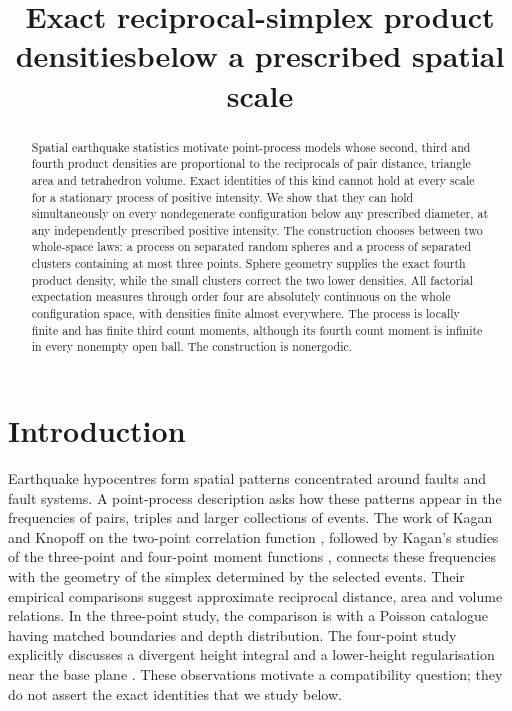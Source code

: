 \documentclass[11pt,a4paper]{article}
\title{Exact reciprocal-simplex product densities\newline below a prescribed spatial scale}
\author{}
\date{}
\numberwithin{equation}{section}
\theoremstyle{definition}
\theoremstyle{remark}
\begin{document}
\maketitle

\begin{abstract}
Spatial earthquake statistics motivate point-process models whose second,
third and fourth product densities are proportional to the reciprocals of
pair distance, triangle area and tetrahedron volume. Exact identities of this
kind cannot hold at every scale for a stationary process of positive
intensity. We show that they can hold simultaneously on every nondegenerate
configuration below any prescribed diameter, at any independently prescribed
positive intensity. The construction chooses between two whole-space laws:
a process on separated random spheres and a process of separated clusters
containing at most three points. Sphere geometry supplies the exact fourth
product density, while the small clusters correct the two lower densities.
All factorial expectation measures through order four are absolutely
continuous on the whole configuration space, with densities finite almost
everywhere. The process is locally finite and has finite third count moments,
although its fourth count moment is infinite in every nonempty open ball.
The construction is nonergodic.
\end{abstract}

\section{Introduction}

Earthquake hypocentres form spatial patterns concentrated around faults and
fault systems. A point-process description asks how these patterns appear in
the frequencies of pairs, triples and larger collections of events. The
work of Kagan and Knopoff on the two-point correlation function
\cite{KaganKnopoff1980}, followed by Kagan's studies of the three-point and
four-point moment functions \cite{Kagan1981Three,Kagan1981Four}, connects
these frequencies with the geometry of the simplex determined by the
selected events. Their empirical comparisons suggest approximate reciprocal
distance, area and volume relations. In the three-point study, the
comparison is with a Poisson catalogue having matched boundaries and depth
distribution. The four-point study explicitly discusses a divergent
height integral and a lower-height regularisation near the base plane
\cite[p.~730]{Kagan1981Four}. These observations motivate a compatibility
question; they do not assert the exact identities that we study below.
\end{document}
